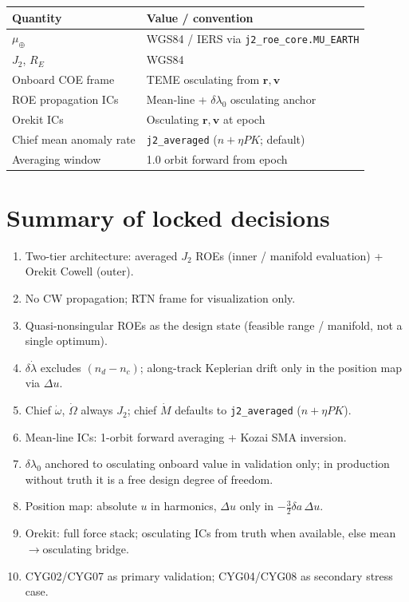 \documentclass[11pt]{article}
\begin{document}
\begin{center}
\begin{tabular}{@{}ll@{}}
\toprule
Quantity & Value / convention \\
\midrule
$\mu_\oplus$ & WGS84 / IERS via \texttt{j2\_roe\_core.MU\_EARTH} \\
$J_2$, $R_E$ & WGS84 \\
Onboard COE frame & TEME osculating from $\mathbf{r},\mathbf{v}$ \\
ROE propagation ICs & Mean-line + $\delta\lambda_0$ osculating anchor \\
Orekit ICs & Osculating $\mathbf{r},\mathbf{v}$ at epoch \\
Chief mean anomaly rate & \texttt{j2\_averaged} ($n+\eta P K$; default) \\
Averaging window & 1.0 orbit forward from epoch \\
\bottomrule
\end{tabular}
\end{center}

\section{Summary of locked decisions}

\begin{enumerate}
    \item Two-tier architecture: averaged $J_2$ ROEs (inner / manifold evaluation) + Orekit Cowell (outer).
    \item No CW propagation; RTN frame for visualization only.
    \item Quasi-nonsingular ROEs as the design state (feasible range / manifold, not a single optimum).
    \item $\delta\dot\lambda$ excludes $(n_d-n_c)$; along-track Keplerian drift only in the position map via $\Delta u$.
    \item Chief $\dot\omega$, $\dot\Omega$ always $J_2$; chief $\dot M$ defaults to \texttt{j2\_averaged} ($n+\eta PK$).
    \item Mean-line ICs: 1-orbit forward averaging + Kozai SMA inversion.
    \item $\delta\lambda_0$ anchored to osculating onboard value in validation only; in production without truth it is a free design degree of freedom.
    \item Position map: absolute $u$ in harmonics, $\Delta u$ only in $-\tfrac{3}{2}\delta a\,\Delta u$.
    \item Orekit: full force stack; osculating ICs from truth when available, else mean$\to$osculating bridge.
    \item CYG02/CYG07 as primary validation; CYG04/CYG08 as secondary stress case.
\end{enumerate}
\end{document}
